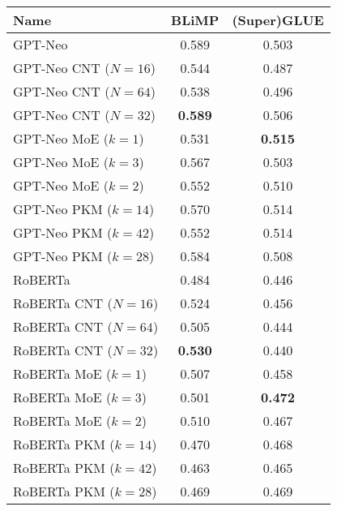 \begin{tabular}{lcc}
\toprule
Name & BLiMP & (Super)GLUE \\
\midrule
GPT-Neo & 0.589 & 0.503 \\
GPT-Neo CNT ($N=16$) & 0.544 & 0.487 \\
GPT-Neo CNT ($N=64$) & 0.538 & 0.496 \\
GPT-Neo CNT ($N=32$) & \textbf{0.589} & 0.506 \\
GPT-Neo MoE ($k=1$) & 0.531 & \textbf{0.515} \\
GPT-Neo MoE ($k=3$) & 0.567 & 0.503 \\
GPT-Neo MoE ($k=2$) & 0.552 & 0.510 \\
GPT-Neo PKM ($k=14$) & 0.570 & 0.514 \\
GPT-Neo PKM ($k=42$) & 0.552 & 0.514 \\
GPT-Neo PKM ($k=28$) & 0.584 & 0.508 \\
\hline
RoBERTa & 0.484 & 0.446 \\
RoBERTa CNT ($N=16$) & 0.524 & 0.456 \\
RoBERTa CNT ($N=64$) & 0.505 & 0.444 \\
RoBERTa CNT ($N=32$) & \textbf{0.530} & 0.440 \\
RoBERTa MoE ($k=1$) & 0.507 & 0.458 \\
RoBERTa MoE ($k=3$) & 0.501 & \textbf{0.472} \\
RoBERTa MoE ($k=2$) & 0.510 & 0.467 \\
RoBERTa PKM ($k=14$) & 0.470 & 0.468 \\
RoBERTa PKM ($k=42$) & 0.463 & 0.465 \\
RoBERTa PKM ($k=28$) & 0.469 & 0.469 \\
\bottomrule
\end{tabular}
